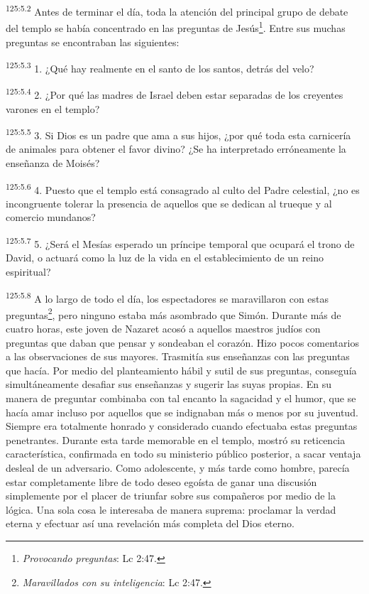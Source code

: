 \par 
\textsuperscript{125:5.2} Antes de terminar el día, toda la atención del principal grupo de debate del templo se había concentrado en las preguntas de Jesús\footnote{\textit{Provocando preguntas}: Lc 2:47.}. Entre sus muchas preguntas se encontraban las siguientes:

\par 
\textsuperscript{125:5.3} 1. ¿Qué hay realmente en el santo de los santos, detrás del velo?

\par 
\textsuperscript{125:5.4} 2. ¿Por qué las madres de Israel deben estar separadas de los creyentes varones en el templo?

\par 
\textsuperscript{125:5.5} 3. Si Dios es un padre que ama a sus hijos, ¿por qué toda esta carnicería de animales para obtener el favor divino? ¿Se ha interpretado erróneamente la enseñanza de Moisés?

\par 
\textsuperscript{125:5.6} 4. Puesto que el templo está consagrado al culto del Padre celestial, ¿no es incongruente tolerar la presencia de aquellos que se dedican al trueque y al comercio mundanos?

\par 
\textsuperscript{125:5.7} 5. ¿Será el Mesías esperado un príncipe temporal que ocupará el trono de David, o actuará como la luz de la vida en el establecimiento de un reino espiritual?

\par 
\textsuperscript{125:5.8} A lo largo de todo el día, los espectadores se maravillaron con estas preguntas\footnote{\textit{Maravillados con su inteligencia}: Lc 2:47.}, pero ninguno estaba más asombrado que Simón. Durante más de cuatro horas, este joven de Nazaret acosó a aquellos maestros judíos con preguntas que daban que pensar y sondeaban el corazón. Hizo pocos comentarios a las observaciones de sus mayores. Trasmitía sus enseñanzas con las preguntas que hacía. Por medio del planteamiento hábil y sutil de sus preguntas, conseguía simultáneamente desafiar sus enseñanzas y sugerir las suyas propias. En su manera de preguntar combinaba con tal encanto la sagacidad y el humor, que se hacía amar incluso por aquellos que se indignaban más o menos por su juventud. Siempre era totalmente honrado y considerado cuando efectuaba estas preguntas penetrantes. Durante esta tarde memorable en el templo, mostró su reticencia característica, confirmada en todo su ministerio público posterior, a sacar ventaja desleal de un adversario. Como adolescente, y más tarde como hombre, parecía estar completamente libre de todo deseo egoísta de ganar una discusión simplemente por el placer de triunfar sobre sus compañeros por medio de la lógica. Una sola cosa le interesaba de manera suprema: proclamar la verdad eterna y efectuar así una revelación más completa del Dios eterno.

